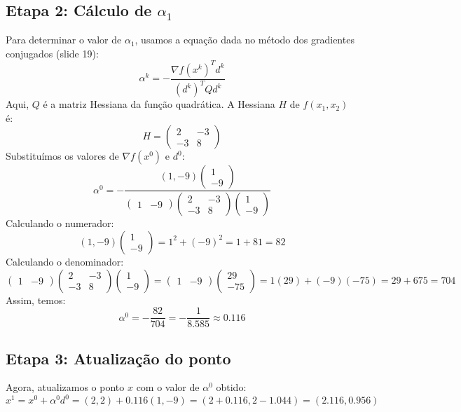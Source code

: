 \documentclass[a4paper, 12pt]{article}
\begin{document}
\subsection{Etapa 2: Cálculo de \( \alpha_1 \)}
Para determinar o valor de \( \alpha_1 \), usamos a equação dada no método dos gradientes conjugados (slide 19):
\[
\alpha^k = -\frac{\nabla f(x^k)^T d^k}{(d^k)^T Q d^k}
\]
Aqui, \( Q \) é a matriz Hessiana da função quadrática. A Hessiana \( H \) de \( f(x_1, x_2) \) é:
\[
H = \begin{pmatrix} 2 & -3 \\ -3 & 8 \end{pmatrix}
\]
Substituímos os valores de \( \nabla f(x^0) \) e \( d^0 \):
\[
\alpha^0 = -\frac{(1, -9) \begin{pmatrix} 1 \\ -9 \end{pmatrix}}{\begin{pmatrix} 1 & -9 \end{pmatrix} \begin{pmatrix} 2 & -3 \\ -3 & 8 \end{pmatrix} \begin{pmatrix} 1 \\ -9 \end{pmatrix}}
\]
Calculando o numerador:
\[
(1, -9) \begin{pmatrix} 1 \\ -9 \end{pmatrix} = 1^2 + (-9)^2 = 1 + 81 = 82
\]
Calculando o denominador:
\[
\begin{pmatrix} 1 & -9 \end{pmatrix} \begin{pmatrix} 2 & -3 \\ -3 & 8 \end{pmatrix} \begin{pmatrix} 1 \\ -9 \end{pmatrix} = \begin{pmatrix} 1 & -9 \end{pmatrix} \begin{pmatrix} 29 \\ -75 \end{pmatrix} = 1(29) + (-9)(-75) = 29 + 675 = 704
\]
Assim, temos:
\[
\alpha^0 = -\frac{82}{704} = -\frac{1}{8.585} \approx 0.116
\]

\subsection{Etapa 3: Atualização do ponto}
Agora, atualizamos o ponto \( x \) com o valor de \( \alpha^0 \) obtido:
\[
x^1 = x^0 + \alpha^0 d^0 = (2, 2) + 0.116 (1, -9) = (2 + 0.116, 2 - 1.044) = (2.116, 0.956)
\]
\end{document}
